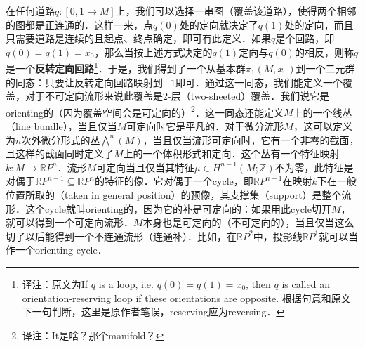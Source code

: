 



在任何道路$q:[0, 1\to M]$上，我们可以选择一串图（覆盖该道路），使得两个相邻的图都是正连通的．这样一来，点$q(0)$处的定向就决定了$q(1)$处的定向，而且只需要道路是连续的且起点、终点确定，即可有此定义．如果$q$是个回路，即$q(0)=q(1)=x_0$，那么当按上述方式决定的$q(1)$定向与$q(0)$的相反，则称$q$是一个\textbf{反转定向回路}\footnote{译注：原文为If $q$ is a loop, i.e. $q(0)=q(1)=x_0$, then $q$ is called an orientation-reserving loop if these orientations are opposite. 根据句意和原文下一句判断，这里是原作者笔误，reserving应为reversing．}．于是，我们得到了一个从基本群$\pi_1(M, x_0)$到一个二元群的同态：只要让反转定向回路映射到$-1$即可．通过这一同态，我们能定义一个覆盖，对于不可定向流形来说此覆盖是2-层（two-sheeted）覆盖．我们说它是orienting的（因为覆盖空间会是可定向的）\footnote{译注：It是啥？那个manifold？}．这一同态还能定义$M$上的一个线丛（line bundle），当且仅当$M$可定向时它是平凡的．对于微分流形$M$，这可以定义为$n$次外微分形式的丛$\bigwedge^n(M)$，当且仅当流形可定向时，它有一个非零的截面，且这样的截面同时定义了$M$上的一个体积形式和定向．这个丛有一个特征映射$k:M\to \mathbb{R}P^n$．流形$M$可定向当且仅当其特征$\mu\in H^{n-1}(M; \mathbb{Z})$不为零，此特征是对偶于$\mathbb{R}P^{n-1}\subseteq \mathbb{R}P^{n}$的特征的像．它对偶于一个cycle，即$\mathbb{R}P^{n-1}$在映射$k$下在一般位置所取的（taken in general position）的预像，其支撑集（support）是整个流形．这个cycle就叫orienting的，因为它的补是可定向的：如果用此cycle切开$M$，就可以得到一个可定向流形．$M$本身也是可定向的（不可定向的），当且仅当这么切了以后能得到一个不连通流形（连通补）．比如，在$\mathbb{R}P^2$中，投影线$\mathbb{R}P^1$就可以当作一个orienting cycle．

